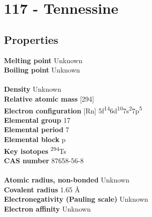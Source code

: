 \section{117 - Tennessine}
\label{sec:elem-tennessine}
\subsection{Properties}
\textbf{Melting point} Unknown\\
\textbf{Boiling point} Unknown\\
\\
\textbf{Density} Unknown\\
\textbf{Relative atomic mass} [294]\\
\textbf{Electron configuration} [Rn] 5f\textsuperscript{14}6d\textsuperscript{10}7s\textsuperscript{2}7p\textsuperscript{5}\\
\textbf{Elemental group} 17\\
\textbf{Elemental period} 7\\
\textbf{Elemental block} p\\
\textbf{Key isotopes} \textsuperscript{294}Ts\\
\textbf{CAS number} 87658-56-8\\
\\
\textbf{Atomic radius, non-bonded} Unknown\\
\textbf{Covalent radius} 1.65 Å\\
\textbf{Electronegativity (Pauling scale)} Unknown\\
\textbf{Electron affinity} Unknown\\